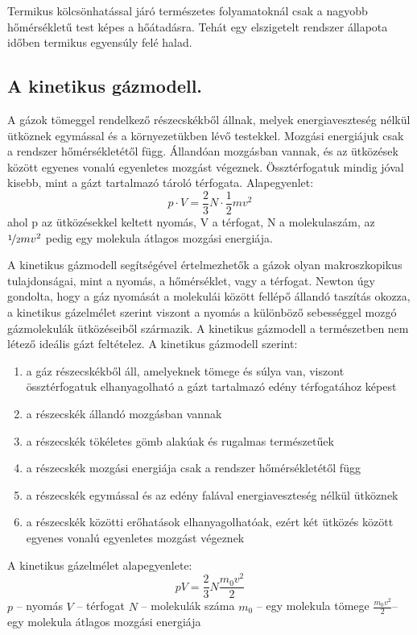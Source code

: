 \begin{theorem}[II. főtétel]
	Termikus kölcsönhatással járó természetes folyamatoknál csak a nagyobb hőmérsékletű test képes a hőátadásra. Tehát egy elszigetelt rendszer állapota időben termikus egyensúly felé halad.
\end{theorem}

\subsection{A kinetikus gázmodell.}
A gázok tömeggel rendelkező részecskékből állnak, melyek energiaveszteség nélkül ütköznek egymással és a környezetükben lévő testekkel. Mozgási energiájuk csak a rendszer hőmérsékletétől függ. Állandóan mozgásban vannak, és az ütközések között egyenes vonalú egyenletes mozgást végeznek. Össztérfogatuk mindig jóval kisebb, mint a gázt tartalmazó tároló térfogata.
Alapegyenlet: $$p \cdot V = \frac{2}{3}N \cdot \frac{1}{2}mv^2$$ ahol p az ütközésekkel keltett nyomás, V a térfogat, N a molekulaszám, az $\nicefrac{1}{2}mv^2$ pedig egy molekula átlagos mozgási energiája.

A kinetikus gázmodell segítségével értelmezhetők a gázok olyan makroszkopikus tulajdonságai, mint a nyomás, a hőmérséklet, vagy a térfogat. Newton úgy gondolta, hogy a gáz nyomását a molekulái között fellépő állandó taszítás okozza, a kinetikus gázelmélet szerint viszont a nyomás a különböző sebességgel mozgó gázmolekulák ütközéseiből származik. A kinetikus gázmodell a természetben nem létező ideális gázt feltételez.
A kinetikus gázmodell szerint:
\begin{enumerate}
	\item a gáz részecskékből áll, amelyeknek tömege és súlya van, viszont össztérfogatuk elhanyagolható a gázt tartalmazó edény térfogatához képest
	\item a részecskék állandó mozgásban vannak
	\item a részecskék tökéletes gömb alakúak és rugalmas természetűek
	\item a részecskék mozgási energiája csak a rendszer hőmérsékletétől függ
	\item a részecskék egymással és az edény falával energiaveszteség nélkül ütköznek
	\item a részecskék közötti erőhatások elhanyagolhatóak, ezért két ütközés között egyenes vonalú egyenletes mozgást végeznek
\end{enumerate}
A kinetikus gázelmélet alapegyenlete:
$$ pV = \frac{2}{3}N \frac{m_0v^2}{2}$$
$p$ – nyomás
$V$ – térfogat
$N$ – molekulák száma
$m_0$ – egy molekula tömege
$\frac{m_0v^2}{2}$– egy molekula átlagos mozgási energiája